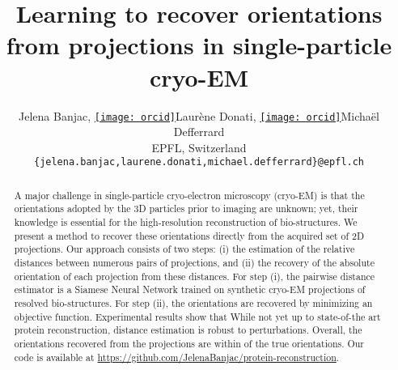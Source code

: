\documentclass{article}
\author{
    Jelena Banjac, \href{https://orcid.org/0000-0001-9834-7755}{\texttt{[image: orcid]}\hspace{1mm}}Laurène Donati, \href{https://orcid.org/0000-0000-0000-0000}{\texttt{[image: orcid]}\hspace{1mm}}Michaël Defferrard \\
    EPFL, Switzerland \\
    \texttt{\{jelena.banjac,laurene.donati,michael.defferrard\}@epfl.ch}
}
\date{}
\title{Learning to recover orientations from projections in single-particle cryo-EM}
\begin{document}
\maketitle

\begin{abstract}
    A major challenge in single-particle cryo-electron microscopy (cryo-EM) is that the orientations adopted by the 3D particles prior to imaging are unknown; yet, their knowledge is essential for the high-resolution reconstruction of bio-structures.
    We present a method to recover these orientations directly from the acquired set of 2D projections. Our approach consists of two steps: (i) the estimation of the relative distances between numerous pairs of projections, and (ii) the recovery of the absolute orientation of each projection from these distances.
    For step (i), the pairwise distance estimator is a Siamese Neural Network trained on synthetic cryo-EM projections of resolved bio-structures.
    For step (ii), the orientations are recovered by minimizing an objective function.
    Experimental results show that  %
    While not yet up to state-of-the art protein reconstruction, distance estimation is robust to perturbations.
    Overall, the orientations recovered from the  projections are within \todo{10\degree} of the true orientations.
    Our code is available at \url{https://github.com/JelenaBanjac/protein-reconstruction}.
\end{abstract}


\end{document}
